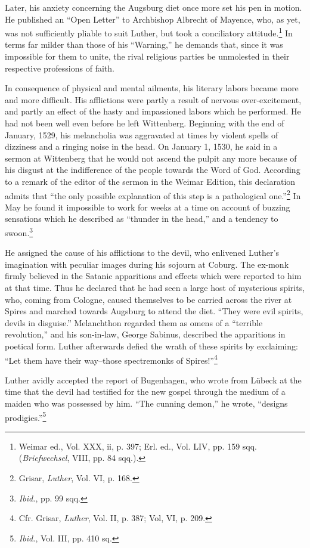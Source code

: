 Later, his anxiety concerning the Augsburg diet once more set his
pen in motion. He published an “Open Letter” to Archbishop Albrecht of
Mayence, who, as yet, was not sufficiently pliable to suit
Luther, but took a conciliatory attitude.\footnote
{Weimar ed., Vol. XXX, ii, p. 397; Erl. ed., Vol. LIV, pp. 159 sqq. (\textit{Briefwechsel},
VIII, pp. 84 sqq.).}
In terms far milder than
those of his “Warning,” he demands that, since it was impossible for
them to unite, the rival religious parties be unmolested in their respective
professions of faith.

In consequence of physical and mental ailments, his literary labors
became more and more difficult. His afflictions were partly a result of
nervous over-excitement, and partly an effect of the hasty and impassioned
labors which he performed. He had not been well even
before he left Wittenberg. Beginning with the end of January, 1529,
his melancholia was aggravated at times by violent spells of dizziness
and a ringing noise in the head. On January 1, 1530, he said in a sermon
at Wittenberg that he would not ascend the pulpit any more
because of his disgust at the indifference of the people towards the
Word of God. According to a remark of the editor of the sermon in
the Weimar Edition, this declaration admits that “the only possible
explanation of this step is a pathological one.”\footnote
{Grisar, \textit{Luther}, Vol. VI, p. 168.}
In May he found it
impossible to work for weeks at a time on account of buzzing sensations
which he described as “thunder in the head,” and a tendency to
swoon.\footnote{\textit{Ibid.}, pp. 99 sqq.}

He assigned the cause of his afflictions to the devil, who enlivened
Luther’s imagination with peculiar images during his sojourn at Coburg.
The ex-monk firmly believed in the Satanic apparitions and
effects which were reported to him at that time. Thus he declared
that he had seen a large host of mysterious spirits, who, coming from
Cologne, caused themselves to be carried across the river at Spires and
marched towards Augsburg to attend the diet. “They were evil spirits,
devils in disguise.” Melanchthon regarded them as omens of a “terrible
revolution,” and his son-in-law, George Sabinus, described the
apparitions in poetical form. Luther afterwards defied the wrath of
these spirits by exclaiming: “Let them have their way--those spectremonks
of Spires!”\footnote{Cfr. Grisar, \textit{Luther}, Vol. II, p. 387; Vol, VI, p. 209.}

Luther avidly accepted the report of Bugenhagen, who wrote from Lübeck
at the time that the devil had testified for the new gospel through the medium of a maiden who was
possessed by him. “The cunning demon,” he wrote, “designs prodigies.”\footnote
{\textit{Ibid.}, Vol. III, pp. 410 sq.}

